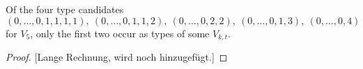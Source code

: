 \begin{proposition}
Of the four type candidates
\[
(0,\dotsc,0,1,1,1,1),\ (0,\dotsc,0,1,1,2),\ (0,\dotsc,0,2,2),\ (0,\dotsc,0,1,3),\ (0,\dotsc,0,4)
\]
for $V_5$, only the first two occur as types of some $V_{k,t}$.
\end{proposition}

\begin{proof}
{}[Lange Rechnung, wird noch hinzugefügt.]
\end{proof}